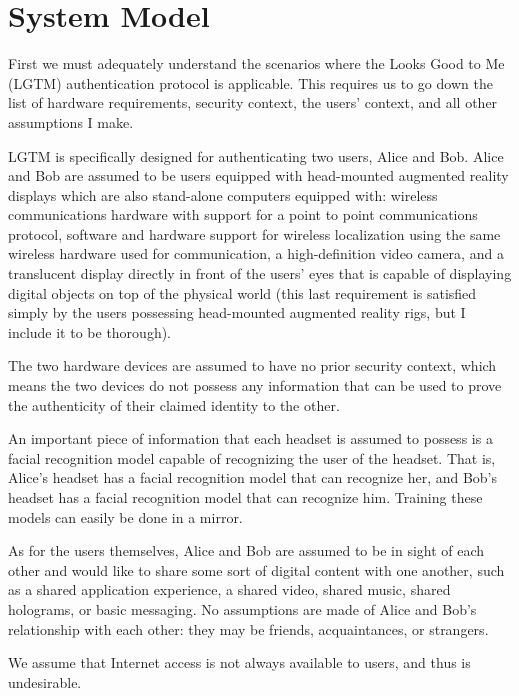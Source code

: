 \documentclass[12pt]{report}
\begin{document}
\section{System Model}
First we must adequately understand the scenarios where the Looks Good to Me (LGTM) authentication protocol is applicable. This requires us to go down the list of hardware requirements, security context, the users' context, and all other assumptions I make. \par

LGTM is specifically designed for authenticating two users, Alice and Bob. Alice and Bob are assumed to be users equipped with head-mounted augmented reality displays which are also stand-alone computers equipped with: wireless communications hardware with support for a point to point communications protocol, software and hardware support for wireless localization using the same wireless hardware used for communication, a high-definition video camera, and a translucent display directly in front of the users' eyes that is capable of displaying digital objects on top of the physical world (this last requirement is satisfied simply by the users possessing head-mounted augmented reality rigs, but I include it to be thorough). \par

The two hardware devices are assumed to have no prior security context, which means the two devices do not possess any information that can be used to prove the authenticity of their claimed identity to the other. \par

An important piece of information that each headset is assumed to possess is a facial recognition model capable of recognizing the user of the headset. That is, Alice's headset has a facial recognition model that can recognize her, and Bob's headset has a facial recognition model that can recognize him. Training these models can easily be done in a mirror. \par

As for the users themselves, Alice and Bob are assumed to be in sight of each other and would like to share some sort of digital content with one another, such as a shared application experience, a shared video, shared music, shared holograms, or basic messaging. No assumptions are made of Alice and Bob's relationship with each other: they may be friends, acquaintances, or strangers. \par

We assume that Internet access is not always available to users, and thus is undesirable. \par
\end{document}
